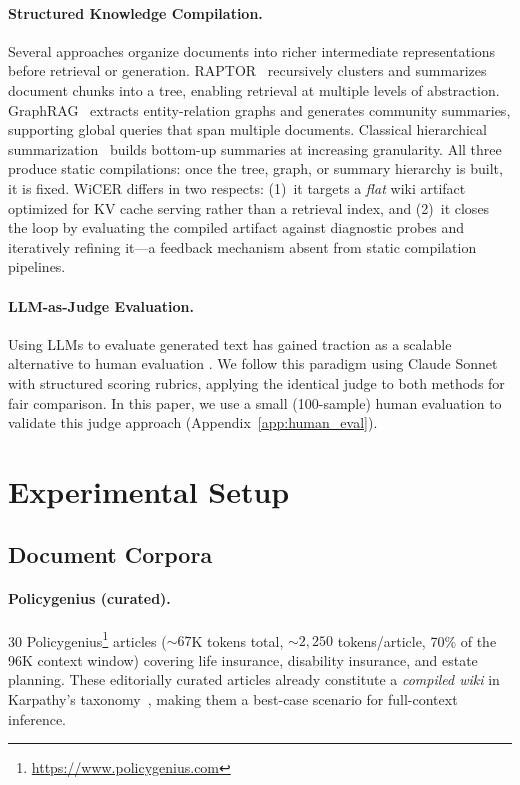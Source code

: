 \documentclass{article}
\begin{document}
\paragraph{Structured Knowledge Compilation.}
Several approaches organize documents into richer intermediate
representations before retrieval or generation.
RAPTOR~\cite{sarthi2024raptor} recursively clusters and summarizes
document chunks into a tree, enabling retrieval at multiple levels of
abstraction. GraphRAG~\cite{edge2024graphrag} extracts entity-relation
graphs and generates community summaries, supporting global queries that
span multiple documents. Classical hierarchical
summarization~\cite{chang2023booookscore} builds bottom-up summaries at
increasing granularity. All three produce static compilations: once the
tree, graph, or summary hierarchy is built, it is fixed.
WiCER differs in two respects: (1)~it targets a \emph{flat} wiki artifact
optimized for KV cache serving rather than a retrieval index, and
(2)~it closes the loop by evaluating the compiled artifact against
diagnostic probes and iteratively refining it---a feedback mechanism
absent from static compilation pipelines.

\paragraph{LLM-as-Judge Evaluation.}
Using LLMs to evaluate generated text has gained traction as a scalable
alternative to human evaluation \cite{zheng2024judging,chiang2023can}.
We follow this paradigm using Claude Sonnet with structured scoring rubrics,
applying the identical judge to both methods for fair comparison.
In this paper, we use a small (100-sample) human evaluation to validate this judge approach (Appendix~\ref{app:human_eval}).

\section{Experimental Setup}
\label{sec:setup}

\subsection{Document Corpora}

\paragraph{Policygenius (curated).}
30 Policygenius\footnote{\url{https://www.policygenius.com}} articles
(${\sim}67$K tokens total, ${\sim}2{,}250$ tokens/article, 70\% of the
96K context window) covering life insurance, disability insurance, and
estate planning. These editorially curated articles already constitute a
\emph{compiled wiki} in Karpathy's taxonomy~\cite{karpathy2026llmwiki},
making them a best-case scenario for full-context inference.
\end{document}
